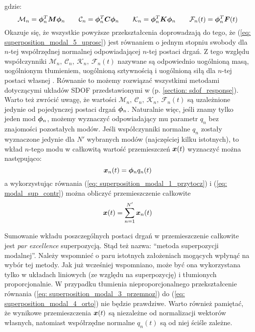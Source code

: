 gdzie:
\begin{equation} \label{eq: superposition_modal_6_podstawki}
	\mathcal{M}_n= \bm{\phi}_n^T \bm{M} \bm{\phi}_n \qquad 
	\mathcal{C}_n= \bm{\phi}_n^T \bm{C} \bm{\phi}_n \qquad 
	\mathcal{K}_n= \bm{\phi}_n^T \bm{K} \bm{\phi}_n \qquad
	\mathcal{F}_n(t)= \bm{\phi}_n^T \bm{F}(t)
\end{equation} 
Okazuje się, że wszystkie powyższe przekształcenia doprowadzają do tego, że (\ref{eq: superposition_modal_5_uprosc}) jest równaniem o jednym stopniu swobody dla $n$-tej współrzędnej normalnej odpowiadającej $n$-tej postaci drgań. Z tego względu współczynniki $\mathcal{M}_n,\:\mathcal{C}_n,\:\mathcal{K}_n,\:\mathcal{F}_n(t)$ nazywane są odpowiednio uogólnioną masą, uogólnionym tłumieniem, uogólnioną sztywnością i uogólnioną siłą dla $n$-tej postaci własnej . Równanie to możemy rozwiązać wszystkimi metodami dotyczącymi układów SDOF przedstawionymi w (p. \ref{section: sdof_response}). Warto też zwrócić uwagę, że wartości $\mathcal{M}_n,\:\mathcal{C}_n,\:\mathcal{K}_n,\:\mathcal{F}_n(t)$ są uzależnione jedynie od pojedynczej postaci drgań $\bm{\phi}_n$. Naturalnie więc, jeśli znamy tylko jeden mod $\bm{\phi}_n$, możemy wyznaczyć odpowiadający mu parametr $q_n$ bez znajomości pozostałych modów.
Jeśli współczynniki normalne $q_n$ zostały wyznaczone jedynie dla $N'$ wybranych modów (najczęściej kilku istotnych), to wkład $n$-tego modu w całkowitą wartość przemieszczeń $\bm{x}(t)$ wyznaczyć można następująco:
\begin{equation} \label{eq: modal_sup_contr}
	\bm{x}_n(t) = \bm{\phi}_n q_n(t)
\end{equation}
a wykorzystując równania (\ref{eq: superposition_modal_1_przytocz}) i (\ref{eq: modal_sup_contr}) można obliczyć przemieszczenie całkowite
\begin{equation}
		\bm{x}(t) = \sum_{n=1}^{N'} \bm{x}_n(t)
\end{equation}

Sumowanie wkładu poszczególnych postaci drgań w przemieszczenie całkowite jest \textit{par excellence} superpozycją. Stąd też nazwa: \enquote{metoda superpozycji modalnej}. Należy wspomnieć o paru istotnych założeniach mogących wpłynąć na wybór tej metody. Jak już wcześniej wspomniano, może być ona wykorzystana tylko w układach liniowych (ze względu na superpozycję) i tłumionych proporcjonalnie. W przypadku tłumienia nieproporcjonalnego przekształcenie równania (\ref{eq: superposition_modal_3_przemnoz}) do (\ref{eq: superposition_modal_4_orto}) nie będzie prawdziwe. Warto również pamiętać, że wynikowe przemieszczenia $\bm{x}(t)$ są niezależne od normalizacji wektorów własnych, natomiast współrzędne normalne $q_n(t)$ są od niej ściśle zależne. 

